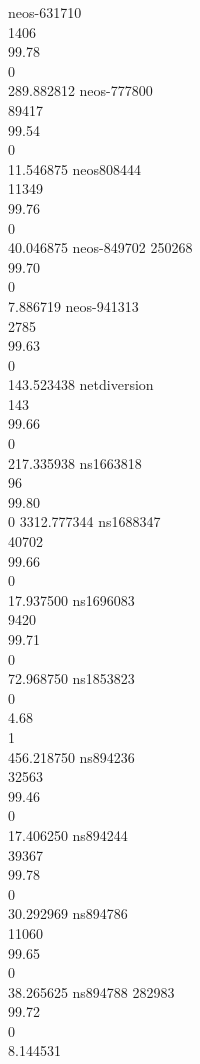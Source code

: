 neos-631710 \\ 1406 \\ 99.78 \\ 0 \\ 289.882812
neos-777800 \\ 89417 \\ 99.54 \\ 0 \\ 11.546875
neos808444 \\ 11349 \\ 99.76 \\ 0 \\ 40.046875
neos-849702 250268 \\ 99.70 \\ 0 \\ 7.886719
neos-941313 \\ 2785 \\ 99.63 \\ 0 \\ 143.523438
netdiversion \\ 143 \\ 99.66 \\ 0 \\ 217.335938
ns1663818 \\ 96 \\ 99.80 \\ 0 3312.777344
ns1688347 \\ 40702 \\ 99.66 \\ 0 \\ 17.937500
ns1696083 \\ 9420 \\ 99.71 \\ 0 \\ 72.968750
ns1853823 \\ 0 \\ 4.68 \\ 1 \\ 456.218750
ns894236 \\ 32563 \\ 99.46 \\ 0 \\ 17.406250
ns894244 \\ 39367 \\ 99.78 \\ 0 \\ 30.292969
ns894786 \\ 11060 \\ 99.65 \\ 0 \\ 38.265625
ns894788 282983 \\ 99.72 \\ 0 \\ 8.144531
